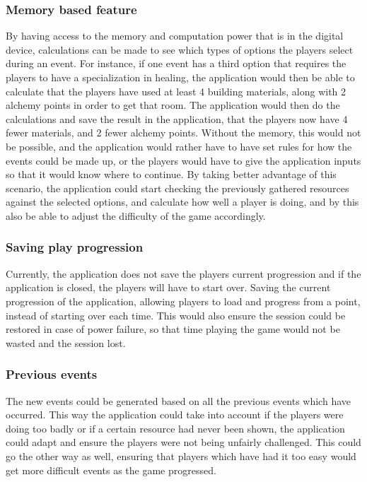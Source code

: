 \subsubsection{Memory based feature}
By having access to the memory and computation power that is in the digital device, calculations can be made to see which types of options the players select during an event. For instance, if one event has a third option that requires the players to have a specialization in healing, the application would then be able to calculate that the players have used at least 4 building materials, along with 2 alchemy points in order to get that room. The application would then do the calculations and save the result in the application, that the players now have 4 fewer materials, and 2 fewer alchemy points. Without the memory, this would not be possible, and the application would rather have to have set rules for how the events could be made up, or the players would have to give the application inputs so that it would know where to continue. By taking better advantage of this scenario, the application could start checking the previously gathered resources against the selected options, and calculate how well a player is doing, and by this also be able to adjust the difficulty of the game accordingly.

\subsubsection{Saving play progression}
Currently, the application does not save the players current progression and if the application is closed, the players will have to start over. Saving the current progression of the application, allowing players to load and progress from a point, instead of starting over each time. This would also ensure the session could be restored in case of power failure, so that time playing the game would not be wasted and the session lost.

\subsubsection{Previous events}
The new events could be generated based on all the previous events which have occurred. This way the application could take into account if the players were doing too badly or if a certain resource had never been shown, the application could adapt and ensure the players were not being unfairly challenged. 
This could go the other way as well, ensuring that players which have had it too easy would get more difficult events as the game progressed.
